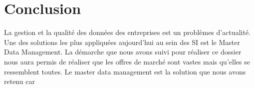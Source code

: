 \section{Conclusion}
	La gestion et la qualité des données des entreprises est un problèmes d'actualité. Une des solutions les plus appliquées aujourd'hui au sein des SI est le Master Data Management. 
La démarche que nous avons suivi pour réaliser ce dossier nous aura permis de réaliser que les offres de marché sont vastes mais qu'elles se ressemblent toutes. Le master data management est la solution que nous avons retenu car 